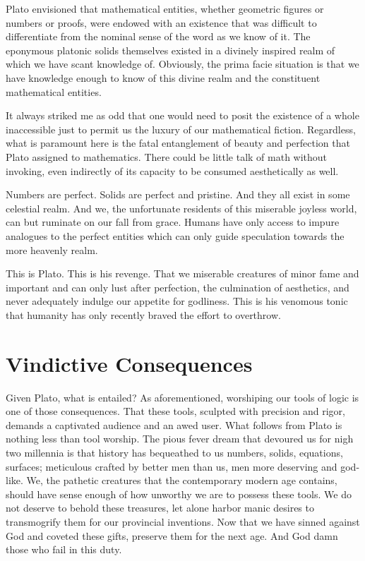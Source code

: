 \documentclass{article}
\begin{document}
	Plato envisioned that mathematical entities, whether geometric figures or numbers or proofs, were endowed with an existence that was difficult to differentiate from the nominal sense of the word as we know of it. The eponymous platonic solids themselves existed in a divinely inspired realm of which we have scant knowledge of. Obviously, the prima facie situation is that we have knowledge enough to know of this divine realm and the constituent mathematical entities.
	
	It always striked me as odd that one would need to posit the existence of a whole inaccessible just to permit us the luxury of our mathematical fiction. Regardless, what is paramount here is the fatal entanglement of beauty and perfection that Plato assigned to mathematics. There could be little talk of math without invoking, even indirectly of its capacity to be consumed aesthetically as well.
	
	Numbers are perfect. Solids are perfect and pristine. And they all exist in some celestial realm. And we, the unfortunate residents of this miserable joyless world, can but ruminate on our fall from grace. Humans have only access to impure analogues to the perfect entities which can only guide speculation towards the more heavenly realm.
	
	This is Plato. This is his revenge. That we miserable creatures of minor fame and important and can only lust after perfection, the culmination of aesthetics, and never adequately indulge our appetite for godliness. This is his venomous tonic that humanity has only recently braved the effort to overthrow.
	
	\section{Vindictive Consequences}
	
	Given Plato, what is entailed? As aforementioned, worshiping our tools of logic is one of those consequences. That these tools, sculpted with precision and rigor, demands a captivated audience and an awed user. What follows from Plato is nothing less than tool worship. The pious fever dream that devoured us for nigh two millennia is that history has bequeathed to us numbers, solids, equations, surfaces; meticulous crafted by better men than us, men more deserving and god-like. We, the pathetic creatures that the contemporary modern age contains, should have sense enough of how unworthy we are to possess these tools. We do not deserve to behold these treasures, let alone harbor manic desires to transmogrify them for our provincial inventions. Now that we have sinned against God and coveted these gifts, preserve them for the next age. And God damn those who fail in this duty.
	
\end{document}
